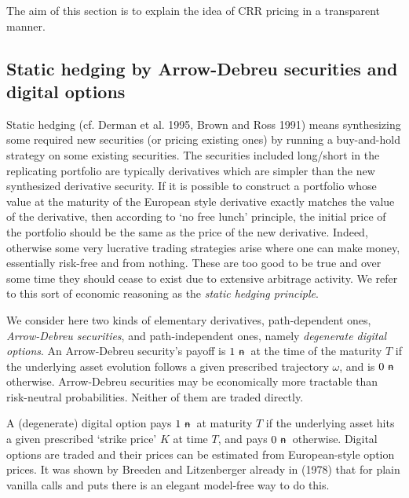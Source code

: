 \documentclass{amsart}
\theoremstyle{definition}
\theoremstyle{remark}
\newcommand{\n}{\!\!\ \nn \!\!\ }
\def\nn{\mathrel{%
    \mathchoice{\n}{\n}{\scriptsize\n}{\tiny\n}%
}}
\def\n {{%
    \setbox0\hbox{ \textsf{n}\!\  }%
    \rlap{\hbox to \wd0{\hss \!\ --\hss}}\box0
}}
\numberwithin{equation}{section}
\newcommand{\1}{\boldsymbol{1}}
\begin{document}
The aim of this section is to explain the idea of CRR pricing in a transparent manner.


 
 
\subsection{Static hedging by Arrow-Debreu securities and digital options}
Static hedging (cf. Derman et al. 1995, Brown and Ross 1991) means synthesizing some required new securities
(or pricing existing ones) by running a buy-and-hold strategy on some existing securities.
The securities included long/short in the replicating portfolio are typically derivatives which are simpler than the 
new synthesized derivative security. If it is possible to construct a portfolio whose value at the maturity of the European style derivative
exactly matches the value of the derivative, then according to `no free lunch' principle, the initial price of the portfolio should
be the same as the price of the new derivative. Indeed, otherwise some very lucrative trading strategies arise where 
one can make money, essentially risk-free and from nothing. These are too good to be true and over some time they should cease to exist due to extensive arbitrage activity. We refer to this sort of economic reasoning as the 
\emph{static hedging principle}. %

We consider here two kinds of elementary derivatives, path-dependent ones, \emph{Arrow-Debreu securities}, and 
path-independent ones, namely \emph{degenerate digital options}. An Arrow-Debreu security's payoff is $1\n$ at the time of the maturity $T$ if the underlying asset evolution follows a given prescribed trajectory $\omega$, and is $0\n$ otherwise. Arrow-Debreu securities may be economically more tractable than risk-neutral probabilities. Neither of them 
are traded directly.

A (degenerate) digital option pays $1\n$ at maturity $T$ if the underlying asset hits a given prescribed `strike price' $K$
at time $T$, and pays $0\n$ otherwise. Digital options are traded and their prices can be estimated from European-style
option prices. It was shown by Breeden and Litzenberger already in (1978) that for plain vanilla calls and puts
there is an elegant model-free way to do this.
\end{document}
